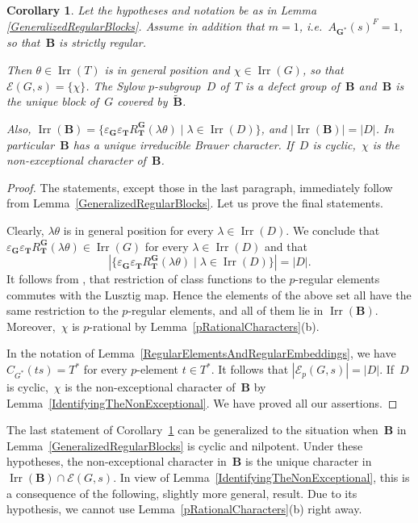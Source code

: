 \documentclass[12pt]{amsart}
\newcommand{\bG}{{\mathbf{G}}}      %
\newcommand{\bB}{{\mathbf{B}}}
\DeclareMathOperator{\Irr}{Irr}
\newtheorem{cor}[thm]{Corollary}
\theoremstyle{theorem}
\theoremstyle{definition}
\theoremstyle{remark}
\begin{document}
\begin{cor}
\label{StrictlyRegularBlocksCor}
Let the hypotheses and notation be as in 
{\rm Lemma \ref{GeneralizedRegularBlocks}.} Assume in addition that $m = 1$,
i.e.\ $A_{\bG^*}( s )^F = 1$, so that~$\bB$ is strictly regular. 

Then $\theta \in \Irr(T)$ is in general position and $\chi \in \Irr(G)$, so that 
$\mathcal{E}( G, s ) = \{ \chi \}$. The Sylow $p$-subgroup~$D$ of~$T$ is a 
defect group of~$\bB$ and~$\bB$ is the unique block of~$G$ covered 
by~$\tilde{\bB}$.

Also, $\Irr( \bB ) = \{ 
\varepsilon_{\mathbf{G}}\varepsilon_{\mathbf{T}}
R_{\mathbf{T}}^{\mathbf{G}}( \lambda\theta ) \mid \lambda \in \Irr(D) \}$,
and $|\Irr( \bB )| = |D|$. In particular~$\bB$ has a unique irreducible Brauer 
character. If~$D$ is cyclic,~$\chi$ is the non-exceptional character of~$\bB$.
\end{cor}
\begin{proof}
The statements, except those in the last paragraph, immediately follow from 
Lemma~\ref{GeneralizedRegularBlocks}. Let us prove the final statements.

Clearly, $\lambda\theta$ is in general position for every $\lambda \in \Irr(D)$. 
We conclude that $\varepsilon_{\mathbf{G}}\varepsilon_{\mathbf{T}}
R_{\mathbf{T}}^{\mathbf{G}}( \lambda\theta ) \in \Irr( G )$ for every
$\lambda \in \Irr(D)$ and that
$$|\{ 
\varepsilon_{\mathbf{G}}\varepsilon_{\mathbf{T}}
R_{\mathbf{T}}^{\mathbf{G}}( \lambda\theta ) \mid \lambda \in \Irr(D) \}| 
= |D|.$$ 
It follows from \cite[Corollary~$7.3.5$]{DiMi2}, that restriction of 
class functions to the $p$-regular 
elements commutes with the Lusztig map. Hence the elements of the above set all 
have the same restriction to the $p$-regular elements, and all of them lie in 
$\Irr( \bB )$. Moreover,~$\chi$ is $p$-rational by 
Lemma~\ref{pRationalCharacters}(b).

In the notation of Lemma~\ref{RegularElementsAndRegularEmbeddings},
we have $C_{G^*}( ts ) = T^*$ for every $p$-element $t \in T^*$.
It follows that $|\mathcal{E}_p( G, s )| = |D|$. If~$D$ is cyclic,~$\chi$ is the
non-exceptional character of~$\bB$ by Lemma~\ref{IdentifyingTheNonExceptional}.
We have proved all our assertions.
\end{proof}

The last statement of Corollary~\ref{StrictlyRegularBlocksCor} can be 
generalized to the situation when~$\bB$ in 
Lemma~\ref{GeneralizedRegularBlocks} is cyclic and nilpotent. Under these 
hypotheses, the non-exceptional character in~$\bB$ is the unique character in  
$\Irr( \bB ) \cap \mathcal{E}( G, s )$. In view of 
Lemma~\ref{IdentifyingTheNonExceptional}, this is a consequence of the 
following, slightly more general, result. Due to its hypothesis, we cannot use
Lemma~\ref{pRationalCharacters}(b) right away.
\end{document}
